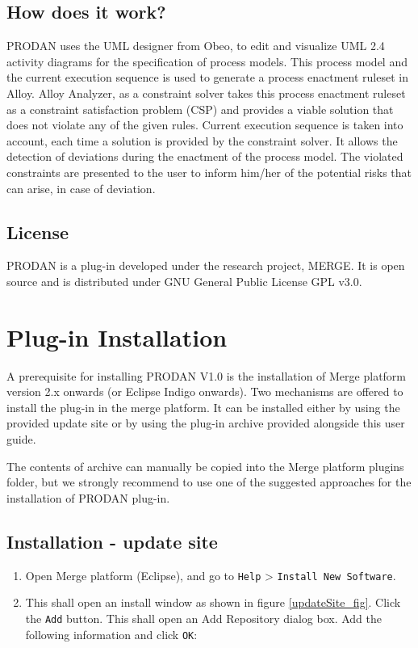 \documentclass[twoside,a4paper]{refart}
\begin{document}
\subsection{How does it work?}
PRODAN uses the UML designer from Obeo, to edit and visualize UML 2.4 activity diagrams for the specification of process models.  This process model and the current execution sequence is used to generate a process enactment ruleset in Alloy.  Alloy Analyzer, as a constraint solver takes this process enactment ruleset as a constraint satisfaction problem (CSP) and provides a viable solution that does not violate any of the given rules.  Current execution sequence is taken into account, each time a solution is provided by the constraint solver.  It allows the detection of deviations during the enactment of the process model.  The violated constraints are presented to the user to inform him/her of the potential risks that can arise, in case of deviation.

\subsection{License}
PRODAN is a plug-in developed under the research project, MERGE.  It is open source and is distributed under GNU General Public License GPL v3.0.    

\newpage
\section{Plug-in Installation}

A prerequisite for installing PRODAN V1.0 is the installation of Merge platform version 2.x onwards (or Eclipse Indigo onwards).
Two mechanisms are offered to install the plug-in in the merge platform.  It can be installed either by using the provided update site or by using the plug-in archive provided alongside this user guide.

\attention
The contents of archive can manually be copied into the Merge platform plugins folder, but we strongly recommend to use one of the suggested approaches for the installation of PRODAN plug-in.

\subsection{Installation - update site}

\begin{enumerate}
\item Open Merge platform (Eclipse), and go to \texttt{Help} > \texttt{Install New Software}.

\item This shall open an install window as shown in figure \ref{updateSite_fig}. Click the \texttt{Add} button.  This shall open an Add Repository dialog box.  Add the following information and click \texttt{OK}:
\end{enumerate}
\end{document}

